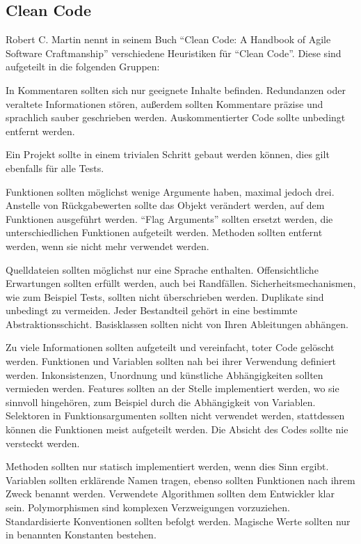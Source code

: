 \newpage

\subsection{Clean Code}
Robert C. Martin nennt in seinem Buch \enquote{Clean Code: A Handbook of Agile Software Craftmanship}\cite{clean-code} verschiedene Heuristiken für \enquote{Clean Code}.
Diese sind aufgeteilt in die folgenden Gruppen:

In Kommentaren sollten sich nur geeignete Inhalte befinden.
Redundanzen oder veraltete Informationen stören, außerdem sollten Kommentare präzise und sprachlich sauber geschrieben werden.
Auskommentierter Code sollte unbedingt entfernt werden.

Ein Projekt sollte in einem trivialen Schritt gebaut werden können, dies gilt ebenfalls für alle Tests.

Funktionen sollten möglichst wenige Argumente haben, maximal jedoch drei.
Anstelle von Rückgabewerten sollte das Objekt verändert werden, auf dem Funktionen ausgeführt werden.
\enquote{Flag Arguments} sollten ersetzt werden, die unterschiedlichen Funktionen aufgeteilt werden.
Methoden sollten entfernt werden, wenn sie nicht mehr verwendet werden.

Quelldateien sollten möglichst nur eine Sprache enthalten.
Offensichtliche Erwartungen sollten erfüllt werden, auch bei Randfällen.
Sicherheitsmechanismen, wie zum Beispiel Tests, sollten nicht überschrieben werden.
Duplikate sind unbedingt zu vermeiden.
Jeder Bestandteil gehört in eine bestimmte Abstraktionsschicht.
Basisklassen sollten nicht von Ihren Ableitungen abhängen.

Zu viele Informationen sollten aufgeteilt und vereinfacht, toter Code gelöscht werden.
Funktionen und Variablen sollten nah bei ihrer Verwendung definiert werden.
Inkonsistenzen, Unordnung und künstliche Abhängigkeiten sollten vermieden werden.
Features sollten an der Stelle implementiert werden, wo sie sinnvoll hingehören, zum Beispiel durch die Abhängigkeit von Variablen.
Selektoren in Funktionsargumenten sollten nicht verwendet werden, stattdessen können die Funktionen meist aufgeteilt werden.
Die Absicht des Codes sollte nie versteckt werden.

Methoden sollten nur statisch implementiert werden, wenn dies Sinn ergibt.
Variablen sollten erklärende Namen tragen, ebenso sollten Funktionen nach ihrem Zweck benannt werden.
Verwendete Algorithmen sollten dem Entwickler klar sein.
Polymorphismen sind komplexen Verzweigungen vorzuziehen.
Standardisierte Konventionen sollten befolgt werden.
Magische Werte sollten nur in benannten Konstanten bestehen.

